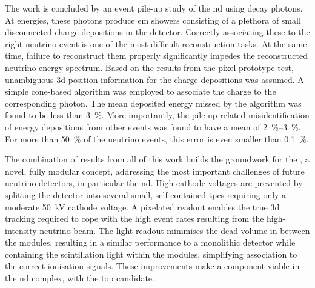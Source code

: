 The work is concluded by an event pile-up study of the \dune{} \gls{nd} using \Pgpz decay photons.
At \dune{} energies, these photons produce \gls{em} showers consisting of a plethora of small disconnected charge depositions in the detector.
Correctly associating these to the right neutrino event is one of the most difficult reconstruction tasks.
At the same time, failure to reconstruct them properly significantly impedes the reconstructed neutrino energy spectrum.
Based on the results from the pixel prototype test, unambiguous \gls{3d} position information for the charge depositions was assumed.
A simple cone-based algorithm was employed to associate the charge to the corresponding photon.
The mean deposited energy missed by the algorithm was found to be less than \SI{3}{\percent}.
More importantly, the pile-up-related misidentification of energy depositions from other events was found to have a mean of \SIrange{2}{3}{\percent}.
For more than \SI{50}{\percent} of the neutrino events, this error is even smaller than \SI{0.1}{\percent}.

The combination of results from all of this work builds the groundwork for the \AC{}, a novel, fully modular \lartpc{} concept, addressing the most important challenges of future neutrino detectors, in particular the \dune{} \gls{nd}.
High cathode voltages are prevented by splitting the detector into several small, self-contained \glspl{tpc} requiring only a moderate \SI{50}{\kilo\volt} cathode voltage.
A pixelated readout enables the true \gls{3d} tracking required to cope with the high event rates resulting from the high-intensity neutrino beam.
The \AL{} light readout minimises the dead volume in between the modules, resulting in a similar performance to a monolithic detector while containing the scintillation light within the modules, simplifying association to the correct ionisation signals.
These improvements make a \lartpc{} component viable in the \dune{} \gls{nd} complex, with \AC{} the top candidate.
